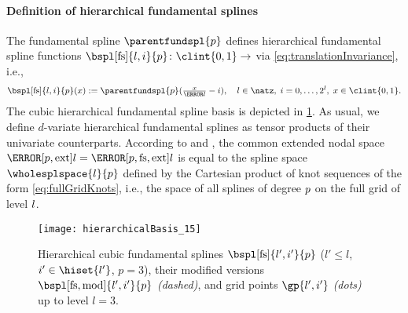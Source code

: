\paragraph{Definition of hierarchical fundamental splines}

The fundamental spline $\parentfundspl{p}$ defines
hierarchical fundamental spline functions
$\bspl[\fs]{l,i}{p}\colon \clint{0, 1} \to \real$ via
\cref{eq:translationInvariance}, i.e.,
\begin{equation}
  \bspl[\fs]{l,i}{p}(x)
  := \parentfundspl{p}(\tfrac{x}{\ms{l}} - i),\quad
  l \in \natz,\;
  i = 0, \dotsc, 2^l,\;
  x \in \clint{0, 1}.
\end{equation}
The cubic hierarchical fundamental spline basis is depicted in
\cref{fig:hierarchicalFundamentalSpline}.
As usual, we define $d$-variate hierarchical fundamental splines
as tensor products of their univariate counterparts.
According to  and ,
the common extended nodal space
$\nsbspl[\ext]{\*l}{\*p} = \nsbspl[\fs,\ext]{\*l}{\*p}$
is equal to the spline space $\wholesplspace{\*l}{\*p}$
defined by the Cartesian product of
knot sequences of the form \eqref{eq:fullGridKnots},
i.e., the space of all splines of degree $\*p$ on the full grid of level $\*l$.

\begin{SCfigure}
  \texttt{[image: hierarchicalBasis\_15]}%
  \caption[%
    Hierarchical fundamental splines%
  ]{%
    Hierarchical cubic fundamental splines
    $\bspl[\fs]{l',i'}{p}$
    ($l' \le l$, $i' \in \hiset{l'}$, $p = 3$),
    their modified versions $\bspl[\fs,\modified]{l',i'}{p}$
    \emph{(dashed)}, and
    grid points $\gp{l',i'}$ \emph{(dots)} up to level $l = 3$.%
  }%
  \label{fig:hierarchicalFundamentalSpline}%
\end{SCfigure}

